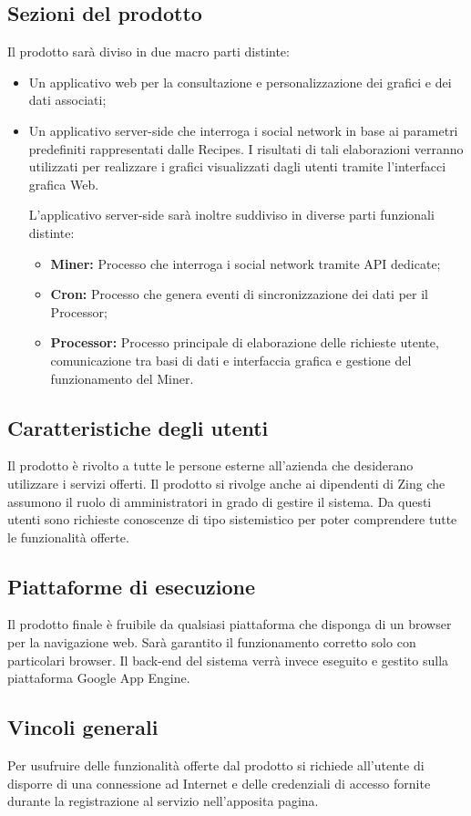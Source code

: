 \subsection{Sezioni del prodotto}
Il prodotto sarà diviso in due macro parti distinte:

\begin{itemize}
\item Un applicativo web per la consultazione e personalizzazione dei grafici e dei dati associati;
\item Un applicativo server-side che interroga i social network in base ai parametri predefiniti rappresentati dalle Recipes. I risultati di tali elaborazioni verranno utilizzati per realizzare i grafici visualizzati dagli utenti tramite l'interfacci grafica Web.

L'applicativo server-side sarà inoltre suddiviso in diverse parti funzionali distinte:
\begin{itemize}
\item \textbf{Miner:} Processo che interroga i social network tramite API dedicate;
\item \textbf{Cron:} Processo che genera eventi di sincronizzazione dei dati per il Processor;
\item \textbf{Processor:} Processo principale di elaborazione delle richieste utente, comunicazione tra basi di dati e interfaccia grafica e gestione del funzionamento del Miner.
\end{itemize}

\end{itemize}

\subsection{Caratteristiche degli utenti}
Il prodotto è rivolto a tutte le persone esterne all'azienda che desiderano utilizzare i servizi offerti. 
Il prodotto si rivolge anche ai dipendenti di Zing che assumono il ruolo di amministratori in grado di gestire il sistema.
Da questi utenti sono richieste conoscenze di tipo sistemistico per poter comprendere tutte le funzionalità offerte.

\subsection{Piattaforme di esecuzione}
Il prodotto finale è fruibile da qualsiasi piattaforma che disponga di un browser per la navigazione web. Sarà garantito il funzionamento corretto solo con particolari browser.
Il back-end del sistema verrà invece eseguito e gestito sulla piattaforma Google App Engine.

\subsection{Vincoli generali}
Per usufruire delle funzionalità offerte dal prodotto si richiede all'utente di disporre
di una connessione ad Internet e delle credenziali di accesso fornite durante la registrazione al servizio nell'apposita pagina.
